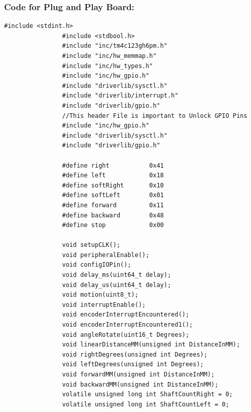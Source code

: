 \documentclass[a4paper,12pt,oneside]{article}
\begin{document}
			\subsubsection{\textbf{Code for Plug and Play Board:}}
			\begin{lstlisting}[style=CStyle]
				#include <stdint.h>
				#include <stdbool.h>
				#include "inc/tm4c123gh6pm.h"
				#include "inc/hw_memmap.h"
				#include "inc/hw_types.h"
				#include "inc/hw_gpio.h"
				#include "driverlib/sysctl.h"
				#include "driverlib/interrupt.h"
				#include "driverlib/gpio.h"
				//This header File is important to Unlock GPIO Pins
				#include "inc/hw_gpio.h"
				#include "driverlib/sysctl.h"
				#include "driverlib/gpio.h"
				
				#define right           0x41
				#define left            0x18
				#define softRight       0x10
				#define softLeft        0x01
				#define forward         0x11
				#define backward        0x48
				#define stop            0x00
				
				void setupCLK();
				void peripheralEnable();
				void configIOPin();
				void delay_ms(uint64_t delay);
				void delay_us(uint64_t delay);
				void motion(uint8_t);
				void interruptEnable();
				void encoderInterruptEncountered();
				void encoderInterruptEncountered1();
				void angleRotate(uint16_t Degrees);
				void linearDistanceMM(unsigned int DistanceInMM);
				void rightDegrees(unsigned int Degrees);
				void leftDegrees(unsigned int Degrees);
				void forwardMM(unsigned int DistanceInMM);
				void backwardMM(unsigned int DistanceInMM);
				volatile unsigned long int ShaftCountRight = 0;
				volatile unsigned long int ShaftCountLeft = 0;
				

\end{lstlisting}
\end{document}
